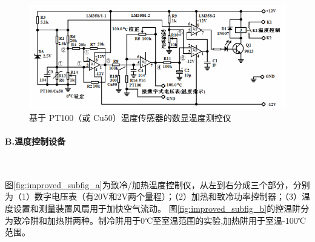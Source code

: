 \documentclass[10pt,a4paper,twocolumn,twoside,UTF8]{ctexart}
\begin{document}
	\begin{figure}[htbp]
	\centering
	\includegraphics[width=1\textwidth]{img//Diagram_Cu50.png}
	\caption{基于 PT100（或 Cu50）温度传感器的数显温度测控仪}
	\label{Diagram_Cu50}
	\end{figure}
	
	\paragraph{B.温度控制设备}~
	\newline

	\indent 图\ref{fig:improved_subfig_a}为致冷/加热温度控制仪，从左到右分成三个部分，分别为（1）数字电压表（有20V和2V两个量程）；（2）加热和致冷功率控制器；（3）温度设置和测量装置风扇用于加快空气流动。
	图\ref{fig:improved_subfig_b}的控温阱分为致冷阱和加热阱两种。制冷阱用于0℃至室温范围的实验,加热阱用于室温-100℃范围。
\end{document}
